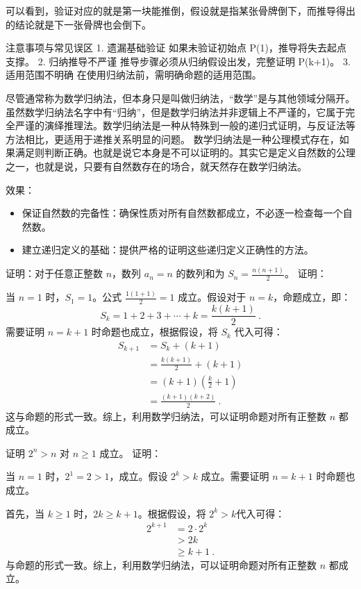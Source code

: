 可以看到，验证对应的就是第一块能推倒，假设就是指某张骨牌倒下，而推导得出的结论就是下一张骨牌也会倒下。

注意事项与常见误区
	1.	遗漏基础验证
如果未验证初始点 P(1)，推导将失去起点支撑。
	2.	归纳推导不严谨
推导步骤必须从归纳假设出发，完整证明 P(k+1)。
	3.	适用范围不明确
在使用归纳法前，需明确命题的适用范围。

尽管通常称为数学归纳法，但本身只是叫做归纳法，“数学”是与其他领域分隔开。虽然数学归纳法名字中有“归纳”，但是数学归纳法并非逻辑上不严谨的，它属于完全严谨的演绎推理法。数学归纳法是一种从特殊到一般的递归式证明，与反证法等方法相比，更适用于递推关系明显的问题。
数学归纳法是一种公理模式存在，如果满足则判断正确。也就是说它本身是不可以证明的。其实它是定义自然数的公理之一，也就是说，只要有自然数存在的场合，就天然存在数学归纳法。

效果：
\begin{itemize}
\item 保证自然数的完备性：确保性质对所有自然数都成立，不必逐一检查每一个自然数。
\item 建立递归定义的基础：提供严格的证明这些递归定义正确性的方法。
\end{itemize}

\begin{example}{证明：对于任意正整数 $n$，数列 $a_n=n$ 的数列和为 $S_n = \frac{n(n+1)}{2}$。}
证明：

当 $n = 1$ 时，$S_1 = 1$。公式 $\frac{1(1+1)}{2} = 1$ 成立。假设对于 $n = k$，命题成立，即：
\begin{equation}
S_k = 1 + 2 + 3 + \cdots + k = \frac{k(k+1)}{2}~.
\end{equation}
需要证明 $n = k+1$ 时命题也成立，根据假设，将 $S_k$ 代入可得：
\begin{equation}
\begin{aligned}
S_{k+1} &= S_k + (k+1)\\
&= \frac{k(k+1)}{2} + (k+1)\\
&= (k+1)\left(\frac{k}{2} +1\right)\\
&= \frac{(k+1)(k+2)}{2}~.
\end{aligned}
\end{equation}
这与命题的形式一致。综上，利用数学归纳法，可以证明命题对所有正整数 $n$ 都成立。
\end{example}

\begin{example}{证明 $2^n > n$ 对 $n \geq 1$ 成立。}
证明：

当 $n = 1$ 时，$2^1 = 2 > 1$，成立。假设 $2^k > k$ 成立。需要证明 $n = k+1$ 时命题也成立。

首先，当 $k \geq 1$ 时，$2k \geq k+1$。根据假设，将 $2^k > k$代入可得：
\begin{equation}
\begin{aligned}
2^{k+1} &= 2 \cdot 2^k\\
&> 2k\\
&\geq k+1~.
\end{aligned}
\end{equation}
与命题的形式一致。综上，利用数学归纳法，可以证明命题对所有正整数 $n$ 都成立。
\end{example}

